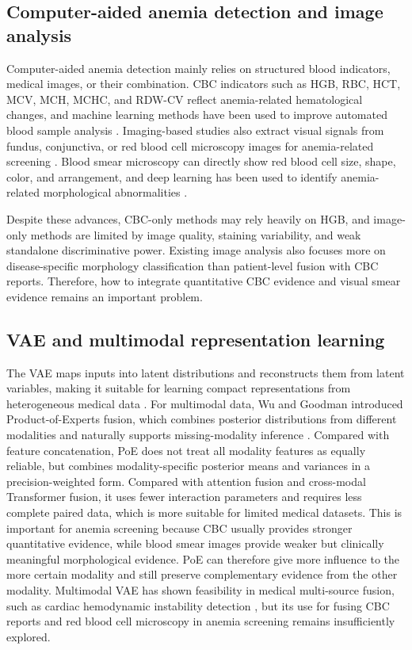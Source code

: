 \documentclass[conference,letterpaper]{IEEEtran}
\begin{document}
\subsection{Computer-aided anemia detection and image analysis}

Computer-aided anemia detection mainly relies on structured blood indicators, medical images, or their combination. CBC indicators such as HGB, RBC, HCT, MCV, MCH, MCHC, and RDW-CV reflect anemia-related hematological changes, and machine learning methods have been used to improve automated blood sample analysis \cite{ref4}. Imaging-based studies also extract visual signals from fundus, conjunctiva, or red blood cell microscopy images for anemia-related screening \cite{ref5}. Blood smear microscopy can directly show red blood cell size, shape, color, and arrangement, and deep learning has been used to identify anemia-related morphological abnormalities \cite{ref6,ref7}.

Despite these advances, CBC-only methods may rely heavily on HGB, and image-only methods are limited by image quality, staining variability, and weak standalone discriminative power. Existing image analysis also focuses more on disease-specific morphology classification than patient-level fusion with CBC reports. Therefore, how to integrate quantitative CBC evidence and visual smear evidence remains an important problem.

\subsection{VAE and multimodal representation learning}

The VAE maps inputs into latent distributions and reconstructs them from latent variables, making it suitable for learning compact representations from heterogeneous medical data \cite{ref8}. For multimodal data, Wu and Goodman introduced Product-of-Experts fusion, which combines posterior distributions from different modalities and naturally supports missing-modality inference \cite{ref9}. Compared with feature concatenation, PoE does not treat all modality features as equally reliable, but combines modality-specific posterior means and variances in a precision-weighted form. Compared with attention fusion and cross-modal Transformer fusion, it uses fewer interaction parameters and requires less complete paired data, which is more suitable for limited medical datasets. This is important for anemia screening because CBC usually provides stronger quantitative evidence, while blood smear images provide weaker but clinically meaningful morphological evidence. PoE can therefore give more influence to the more certain modality and still preserve complementary evidence from the other modality. Multimodal VAE has shown feasibility in medical multi-source fusion, such as cardiac hemodynamic instability detection \cite{ref10}, but its use for fusing CBC reports and red blood cell microscopy in anemia screening remains insufficiently explored.
\end{document}
